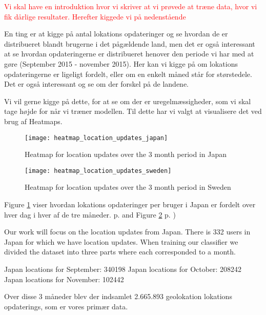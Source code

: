 \textcolor{red}{Vi skal have en introduktion hvor vi skriver at vi prøvede at træne data, hvor vi fik dårlige resultater. Herefter kiggede vi på nedenstående}

En ting er at kigge på antal lokations opdateringer og se hvordan de er distribueret blandt brugerne i det pågældende land, men det er også interessant at se hvordan opdateringerne er distribueret henover den periode vi har med at gøre (September 2015 - november 2015). Her kan vi kigge på om lokations opdateringerne er ligeligt fordelt, eller om en enkelt måned står for størstedele. Det er også interessant og se om der forskel på de landene. 

Vi vil gerne kigge på dette, for at se om der er uregelmæssigheder, som vi skal tage højde for når vi træner modellen. 
 Til dette har vi valgt at visualisere det ved brug af Heatmaps. 
\begin{figure}[H]
    \centering
    \texttt{[image: heatmap\_location\_updates\_japan]}
    \caption{Heatmap for location updates over the 3 month period in Japan}
    \label{fig:heatmap_jap}
\end{figure}


\begin{figure}[H]
    \centering
    \texttt{[image: heatmap\_location\_updates\_sweden]}
    \caption{Heatmap for location updates over the 3 month period in Sweden}
    \label{fig:heatmap_swe}
\end{figure}


 Figure \ref{fig:heatmap_jap} viser hvordan lokations opdateringer per bruger i Japan er fordelt over hver dag i hver af de tre måneder. p.  \pageref{fig:heatmap_jap} and Figure \ref{fig:heatmap_swe} p. \pageref{fig:heatmap_swe})


Our work will focus on the location updates from Japan. There is 332 users in Japan for which we have location updates.
When training our classifier we divided the dataset into three parts where each corresponded to a month.

Japan locations for September: 340198
Japan locations for October: 208242
Japan locations for November: 102442



Over disse 3 måneder blev der indsamlet 2.665.893 geolokation lokations opdaterings, som er vores primær data. 

